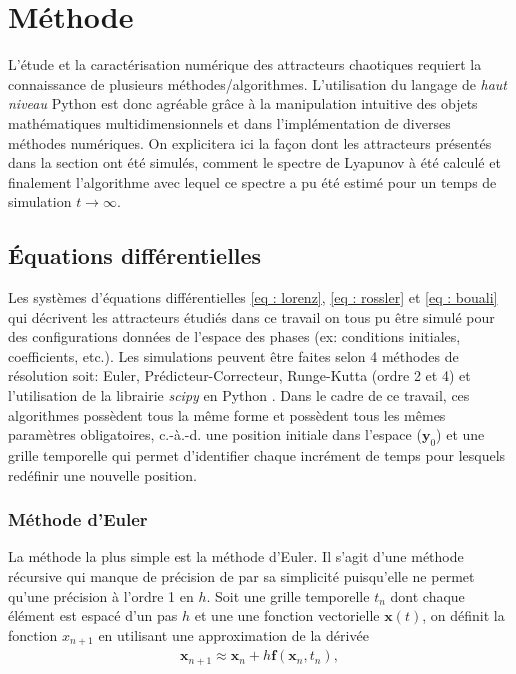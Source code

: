 \section{Méthode} \label{sec: method}
    L'étude et la caractérisation numérique des attracteurs chaotiques
    requiert la connaissance de plusieurs méthodes/algorithmes. L'utilisation
    du langage de \textit{haut niveau} Python est donc agréable grâce à la
    manipulation intuitive des objets mathématiques multidimensionnels et dans
    l'implémentation de diverses méthodes numériques. On explicitera ici la
    façon dont les attracteurs présentés dans la section
     ont été simulés, comment le spectre de
    Lyapunov à été calculé et finalement l'algorithme avec lequel ce spectre a
    pu été estimé pour un temps de simulation $t\to\infty$.

\subsection{Équations différentielles} \label{subsec: res_diff}
    Les systèmes d'équations différentielles \eqref{eq : lorenz},
    \eqref{eq : rossler} et \eqref{eq : bouali} qui décrivent les attracteurs
    étudiés dans ce travail on tous pu être simulé pour des configurations
    données de l'espace des phases (ex: conditions initiales, coefficients,
    etc.). Les simulations peuvent être faites selon 4 méthodes de résolution
    soit: Euler, Prédicteur-Correcteur, Runge-Kutta (ordre 2 et 4) et
    l'utilisation de la librairie \textit{scipy} en Python \cite{SENECH}. Dans
    le cadre de ce travail, ces algorithmes possèdent tous la même forme et
    possèdent tous les mêmes paramètres obligatoires, c.-à.-d. une position
    initiale dans l'espace ($\bm{y}_0$) et une grille temporelle qui permet
    d'identifier chaque incrément de temps pour lesquels redéfinir une
    nouvelle position.

    \subsubsection{Méthode d'Euler} \label{subsubsec: euler}
    La méthode la plus simple est la méthode d'Euler. Il s'agit d'une méthode
    récursive qui manque de précision de par sa simplicité puisqu'elle ne
    permet qu'une précision à l'ordre 1 en $h$. Soit une grille temporelle
    $t_n$ dont chaque élément est espacé d'un pas $h$ et une une fonction
    vectorielle $\bm{x}(t)$, on définit la fonction $x_{n + 1}$ en utilisant
    une approximation de la dérivée
    \begin{align*}
        \bm{x}_{n + 1} \approx \bm{x}_n + h\bm{f}(\bm{x}_n, t_n),
    \end{align*}


